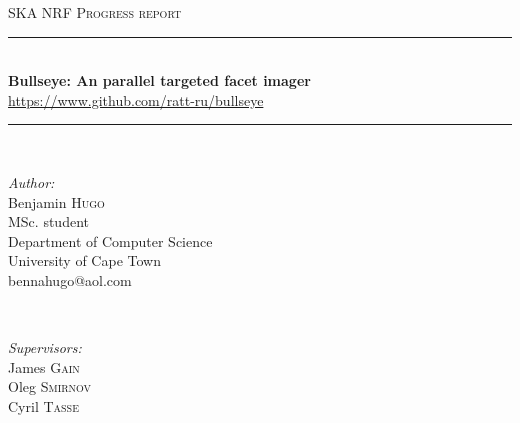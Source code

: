 \documentclass[a4paper,10pt]{article}
\begin{document}
\begin{titlepage}

\newcommand{\HRule}{\rule{\linewidth}{0.5mm}} %

\center %
 

 

\textsc{\LARGE SKA NRF Progress report}\\[1.5cm]


\HRule \\[0.4cm]
{ \huge \bfseries Bullseye: An parallel targeted facet imager}\\[0.4cm]
{ \large \url{https://www.github.com/ratt-ru/bullseye}}
\HRule \\[1.5cm]
 

\begin{minipage}{0.4\textwidth}
\begin{flushleft} \large
\emph{Author:}\\
Benjamin \textsc{Hugo}\\[0.2cm] %
\small{MSc. student}\\
\small{Department of Computer Science}\\
\small{University of Cape Town}\\
\small{bennahugo@aol.com}

\end{flushleft}
\end{minipage}
~
\begin{minipage}{0.4\textwidth}
\begin{flushright} \large
\emph{Supervisors:} \\
James \textsc{Gain} \\
Oleg \textsc{Smirnov} \\
Cyril \textsc{Tasse}\\
\end{flushright}
\end{minipage}\\[3cm]


\end{titlepage}
\end{document}
